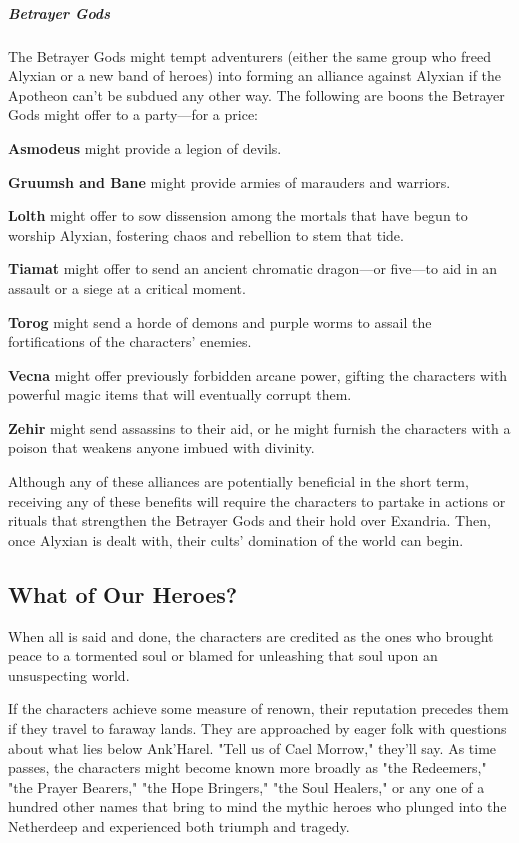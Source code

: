 \documentclass[10pt,a4paper,twoside,fancy,bg=print,twocolumn,openany,nodeprecatedcode]{dndbook}
\begin{document}
\subparagraph{Betrayer Gods}
The Betrayer Gods might tempt adventurers (either the same group who freed Alyxian or a new band of heroes) into forming an alliance against Alyxian if the Apotheon can't be subdued any other way. The following are boons the Betrayer Gods might offer to a party—for a price:

\textbf{Asmodeus} might provide a legion of devils.

\textbf{Gruumsh and Bane} might provide armies of marauders and warriors.

\textbf{Lolth} might offer to sow dissension among the mortals that have begun to worship Alyxian, fostering chaos and rebellion to stem that tide.

\textbf{Tiamat} might offer to send an ancient chromatic dragon—or five—to aid in an assault or a siege at a critical moment.

\textbf{Torog} might send a horde of demons and purple worms to assail the fortifications of the characters' enemies.

\textbf{Vecna} might offer previously forbidden arcane power, gifting the characters with powerful magic items that will eventually corrupt them.

\textbf{Zehir} might send assassins to their aid, or he might furnish the characters with a poison that weakens anyone imbued with divinity.

Although any of these alliances are potentially beneficial in the short term, receiving any of these benefits will require the characters to partake in actions or rituals that strengthen the Betrayer Gods and their hold over Exandria. Then, once Alyxian is dealt with, their cults' domination of the world can begin.

\subsection{What of Our Heroes?}
When all is said and done, the characters are credited as the ones who brought peace to a tormented soul or blamed for unleashing that soul upon an unsuspecting world.

If the characters achieve some measure of renown, their reputation precedes them if they travel to faraway lands. They are approached by eager folk with questions about what lies below Ank'Harel. "Tell us of Cael Morrow," they'll say. As time passes, the characters might become known more broadly as "the Redeemers," "the Prayer Bearers," "the Hope Bringers," "the Soul Healers," or any one of a hundred other names that bring to mind the mythic heroes who plunged into the Netherdeep and experienced both triumph and tragedy.
\end{document}
